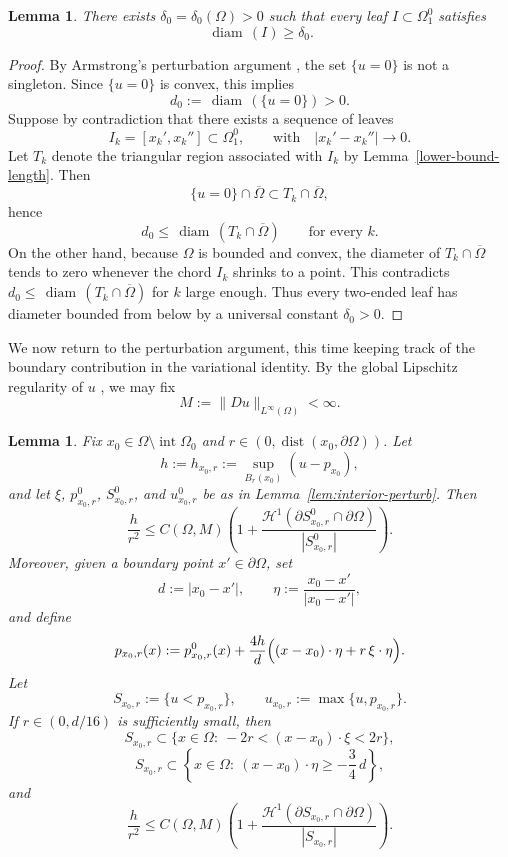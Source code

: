 \documentclass[reqno,11pt]{amsart}
\makeatletter
\def\dist{{\mathop\mathrm{dist}}}
\def\diam{{\mathop\mathrm{\,diam\,}}}
\newtheorem{lem}[thm]{Lemma}%
\numberwithin{equation}{section}
\theoremstyle{remark}
\makeatother
\begin{document}
\begin{lem}\label{lem:leaf-lower-bound}
There exists $\delta_0=\delta_0(\Omega)>0$ such that every leaf
$I\subset\Omega_1^0$ satisfies
\[
\diam(I)\ge \delta_0.
\]
\end{lem}

\begin{proof}
By Armstrong's perturbation argument \cite{A1996}, the set $\{u=0\}$ is not a
singleton. Since $\{u=0\}$ is convex, this implies
\[
d_0:=\diam(\{u=0\})>0.
\]
Suppose by contradiction that there exists a sequence of leaves
\[
I_k=[x_k',x_k'']\subset\Omega_1^0,\qquad \text{with}\quad |x_k'-x_k''|\to0.
\]
Let $T_k$ denote the triangular region associated with $I_k$ by
Lemma~\ref{lower-bound-length}. Then
\[
\{u=0\}\cap\overline\Omega\subset T_k\cap\overline\Omega,
\]
hence
\[
d_0\le \diam(T_k\cap\overline\Omega)
\qquad\text{for every }k.
\]
On the other hand, because $\Omega$ is bounded and convex, the diameter of
$T_k\cap\overline\Omega$ tends to zero whenever the chord $I_k$ shrinks to a
point.
This contradicts $d_0\le \diam(T_k\cap\overline\Omega)$ for $k$ large enough.
Thus every two-ended leaf has diameter bounded from below by a universal
constant $\delta_0>0$.
\end{proof}

We now return to the perturbation argument, this time keeping track of the
boundary contribution in the variational identity.
By the global Lipschitz regularity of $u$ \cite{RC98,CL2001}, we may fix
\[
M:=\|Du\|_{L^\infty(\Omega)}<\infty.
\]

\begin{lem}\label{lem:local-perturb}
Fix $x_0\in \Omega\setminus \operatorname{int}\Omega_0$ and
$r \in (0, \dist(x_0,\partial\Omega))$.
Let
\[
h:=h_{x_0,r}:=\sup_{B_r(x_0)}(u-p_{x_0}),
\]
and let $\xi$, $p_{x_0,r}^0$, $S_{x_0,r}^0$, and $u_{x_0,r}^0$ be as in
Lemma~\ref{lem:interior-perturb}. Then
\begin{equation}\label{key-ineq0}
\frac{h}{r^2}\le C(\Omega,M)\left(
1+\frac{\mathscr H^1(\partial S_{x_0,r}^0\cap\partial\Omega)}
{|S_{x_0,r}^0|}
\right).
\end{equation}
Moreover, given a boundary point $x'\in\partial\Omega$, set
\[
d:=|x_0-x'|,
\qquad
\eta:=\frac{x_0-x'}{|x_0-x'|},
\]
and define
\begin{equation}\label{tilted-plane}
p_{x_0,r}(x):=p_{x_0,r}^0(x)+\frac{4h}{d}\Bigl((x-x_0)\cdot\eta+r\,\xi\cdot\eta\Bigr).
\end{equation}
Let
\[
S_{x_0,r}:=\{u<p_{x_0,r}\},
\qquad
u_{x_0,r}:=\max\{u,p_{x_0,r}\}.
\]
If $r\in (0,d/16)$ is sufficiently small, then
\begin{equation}\label{contain2}
S_{x_0,r}\subset \{x\in\Omega:\ -2r<(x-x_0)\cdot \xi<2r\},
\end{equation}
\begin{equation}\label{contain3}
S_{x_0,r}\subset \left\{x\in\Omega:\ (x-x_0)\cdot \eta\ge -\frac34\,d\right\},
\end{equation}
and
\begin{equation}\label{key-ineq}
\frac{h}{r^2}\le C(\Omega,M)\left(
1+\frac{\mathscr H^1(\partial S_{x_0,r}\cap\partial\Omega)}
{|S_{x_0,r}|}
\right).
\end{equation}
\end{lem}
\end{document}
